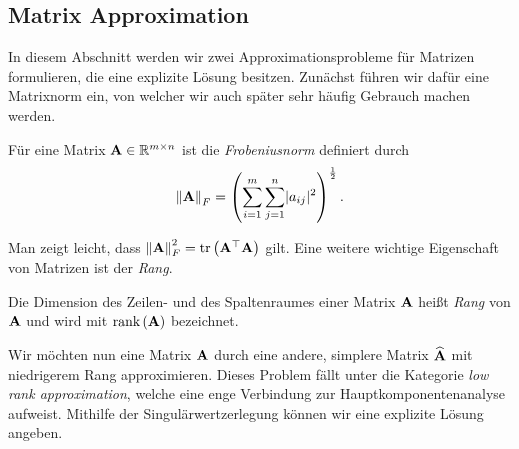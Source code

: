 \subsection{Matrix Approximation}
\label{matrix_approximation}

In diesem Abschnitt werden wir zwei Approximationsprobleme für Matrizen formulieren, die eine explizite Lösung besitzen. Zunächst führen wir dafür eine Matrixnorm ein, von welcher wir auch später sehr häufig Gebrauch machen werden.

\begin{defn}
Für eine Matrix $\mathbf{A} \in \mathbb{R}^{m \times n}$ ist die \textit{Frobeniusnorm} definiert durch
$$\left\lVert \mathbf{A} \right\rVert_F = \left( \sum_{i=1}^{m} \sum_{j=1}^{n} \lvert a_{ij} \rvert ^{2} \right) ^{\frac{1}{2}}.$$
\end{defn}

Man zeigt leicht, dass $\left\lVert \mathbf{A} \right\rVert_F^2 = \text{tr} \left( \mathbf{A}^{\top} \mathbf{A} \right)$ gilt.
Eine weitere wichtige Eigenschaft von Matrizen ist der \textit{Rang}.

\begin{defn}
Die Dimension des Zeilen- und des Spaltenraumes einer Matrix $\mathbf{A}$ heißt \textit{Rang} von $\mathbf{A}$ und wird mit $\text{rank} \left( \mathbf{A} \right)$ bezeichnet.
\end{defn}

Wir möchten nun eine Matrix $\mathbf{A}$ durch eine andere, simplere Matrix $\widehat{\mathbf{A}}$ mit niedrigerem Rang approximieren. Dieses Problem fällt unter die Kategorie \textit{low rank approximation}, welche eine enge Verbindung zur Hauptkomponentenanalyse aufweist. Mithilfe der Singulärwertzerlegung können wir eine explizite Lösung angeben.


